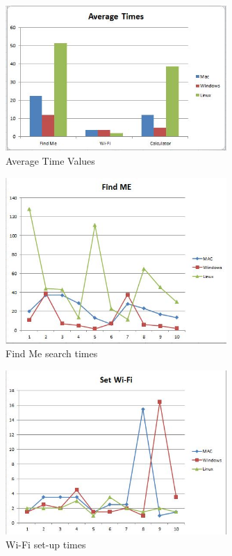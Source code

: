 \documentclass[11pt]{article}
\begin{document}
\begin{figure}[h!]
  \centering
    \includegraphics[width=0.75\textwidth]{./Images/Average_Times}
  \caption{Average Time Values}
\end{figure}

\begin{figure}[h!]
  \centering
    \includegraphics[width=0.75\textwidth]{./Images/Find_ME}
  \caption{Find Me search times}
\end{figure}

\begin{figure}[h!]
  \centering
    \includegraphics[width=0.75\textwidth]{./Images/Wi-Fi}
  \caption{Wi-Fi set-up times}
\end{figure}
\end{document}
